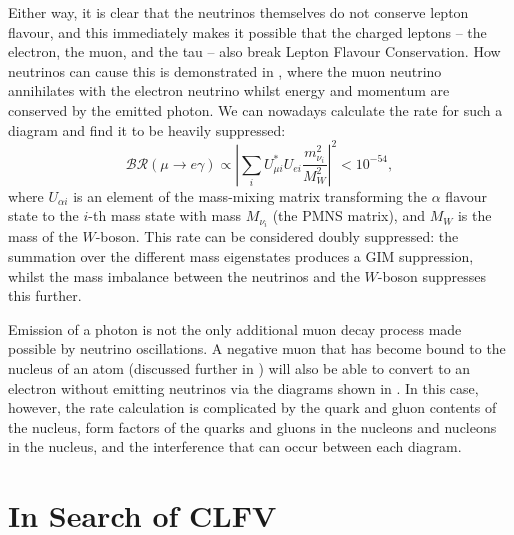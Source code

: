 \FigTheoryMuEConvViaNeutrino
Either way, it is clear that the neutrinos themselves do not conserve lepton flavour, and this immediately makes it possible that the charged leptons -- the electron, the muon, and the tau -- also break Lepton Flavour Conservation.
How neutrinos can cause this is demonstrated in , where the muon neutrino annihilates with the electron neutrino whilst energy and momentum are conserved by the emitted photon.
We can nowadays calculate the rate for such a diagram and find it to be heavily suppressed:
\begin{equation}
\mathcal{BR}(\mu\rightarrow{}e\gamma)\propto\left|\sum_iU^*_{\mu i}U_{ei} \frac{m^2_{\nu_i}}{M^2_W}\right|^2 < 10^{-54},
\end{equation}
where $U_{\alpha i}$ is an element of the mass-mixing matrix transforming the $\alpha$ flavour state to the $i$-th mass state with mass $M_{\nu_i}$ (the \ac{PMNS} matrix), and $M_W$ is the mass of the $W$-boson.
This rate can be considered doubly suppressed: the summation over the different mass eigenstates produces a GIM suppression, whilst the mass imbalance between the neutrinos and the $W$-boson suppresses this further.

Emission of a photon is not the only additional muon decay process made possible by neutrino oscillations.
A negative muon that has become bound to the nucleus of an atom (discussed further in ) will also be able to convert to an electron without emitting neutrinos via the diagrams
shown in .  
In this case, however, the rate calculation is complicated by the quark and gluon contents of the nucleus, form factors of the quarks and gluons in the nucleons and nucleons in the nucleus, and the interference that can occur between each diagram.

\section{In Search of \acf{CLFV}}
